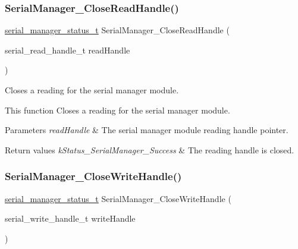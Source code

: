 \subsubsection{\texorpdfstring{SerialManager\_CloseReadHandle()}{SerialManager\_CloseReadHandle()}}
{\footnotesize\ttfamily \mbox{\hyperlink{group__serialmanager_gac1d9f848c57ca245ad9da8d049369da9}{serial\+\_\+manager\+\_\+status\+\_\+t}} Serial\+Manager\+\_\+\+Close\+Read\+Handle (\begin{DoxyParamCaption}\item[{serial\+\_\+read\+\_\+handle\+\_\+t}]{read\+Handle }\end{DoxyParamCaption})}



Closes a reading for the serial manager module. 

This function Closes a reading for the serial manager module.


\begin{DoxyParams}{Parameters}
{\em read\+Handle} & The serial manager module reading handle pointer. \\
\hline
\end{DoxyParams}

\begin{DoxyRetVals}{Return values}
{\em k\+Status\+\_\+\+Serial\+Manager\+\_\+\+Success} & The reading handle is closed. \\
\hline
\end{DoxyRetVals}
\mbox{\label{group__serialmanager_gadb8df1d54da32e6de17680264ca4106a}} 
\subsubsection{\texorpdfstring{SerialManager\_CloseWriteHandle()}{SerialManager\_CloseWriteHandle()}}
{\footnotesize\ttfamily \mbox{\hyperlink{group__serialmanager_gac1d9f848c57ca245ad9da8d049369da9}{serial\+\_\+manager\+\_\+status\+\_\+t}} Serial\+Manager\+\_\+\+Close\+Write\+Handle (\begin{DoxyParamCaption}\item[{serial\+\_\+write\+\_\+handle\+\_\+t}]{write\+Handle }\end{DoxyParamCaption})}



